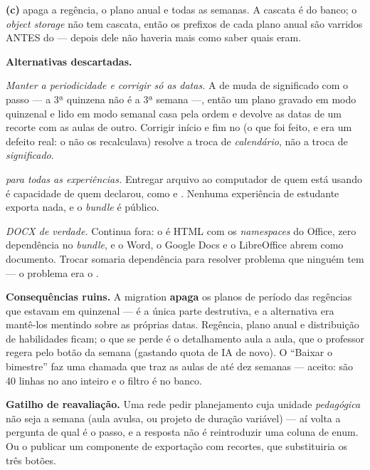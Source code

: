 \textbf{(c) } apaga a regência, o
plano anual e todas as semanas. A cascata é do banco; o \emph{object storage}
não tem cascata, então os prefixos de cada plano anual são varridos ANTES do
 --- depois dele não haveria mais como saber quais eram.

\textbf{Alternativas descartadas.}

\emph{Manter a periodicidade e corrigir só as datas.} A  de
 muda de significado com o passo --- a 3ª
quinzena não é a 3ª semana ---, então um plano gravado em modo quinzenal e lido
em modo semanal casa pela ordem e devolve as datas de um recorte com as aulas de
outro. Corrigir início e fim no  (o que foi feito, e era um defeito
real: o  não os recalculava) resolve a troca de \emph{calendário},
não a troca de \emph{significado}.

\emph{ para todas as experiências.} Entregar arquivo ao
computador de quem está usando é capacidade de quem declarou, como
 e . Nenhuma experiência de estudante exporta nada, e
o \emph{bundle} é público.

\emph{DOCX de verdade.} Continua fora: o  é HTML com os \emph{namespaces}
do Office, zero dependência no \emph{bundle}, e o Word, o Google Docs e o
LibreOffice abrem como documento. Trocar somaria dependência para resolver
problema que ninguém tem --- o problema era o .

\textbf{Consequências ruins.} A migration \textbf{apaga} os planos de período
das regências que estavam em quinzenal --- é a única parte destrutiva, e a
alternativa era mantê-los mentindo sobre as próprias datas. Regência, plano
anual e distribuição de habilidades ficam; o que se perde é o detalhamento aula
a aula, que o professor regera pelo botão da semana (gastando quota de IA de
novo). O \enquote{Baixar o bimestre} faz uma chamada que traz as aulas de até
dez semanas --- aceito: são 40 linhas no ano inteiro e o filtro é no banco.

\textbf{Gatilho de reavaliação.} Uma rede pedir planejamento cuja unidade
\emph{pedagógica} não seja a semana (aula avulsa, ou projeto de duração
variável) --- aí volta a pergunta de qual é o passo, e a resposta não é
reintroduzir uma coluna de enum. Ou o  publicar um
componente de exportação com recortes, que substituiria os três botões.


